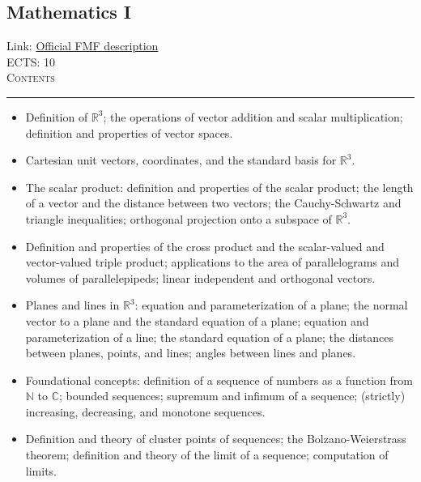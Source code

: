 \documentclass[11pt, a4paper]{article}
\newenvironment{course}[3]{
\subsection{#1}%
Link: \href{#2}{Official FMF description}\\%
ECTS: #3%
\vspace{1ex}
\\
{\large \textsc{Contents}}\\[-0.9ex]%
\rule{\textwidth}{0.5pt}
\vspace{-3ex}
}
{}
\newenvironment{chapter}[1]{
\begin{tcolorbox}[title=#1, breakable]
}
{\end{tcolorbox}}
\begin{document}
\begin{course}{Mathematics I}{https://www.fmf.uni-lj.si/en/study-physics/programmes/1fiz/2020/7000777/courses/520/}{10}
\begin{chapter}{Numbers}
\begin{itemize}
        \end{itemize}
    \end{chapter}

    \begin{chapter}{Geometry of the Euclidean space $ \mathbb{R}^{3} $}
        \begin{itemize}
        
            \item Definition of $ \mathbb{R}^{3} $; the operations of vector addition and scalar multiplication; definition and properties of vector spaces.

            \item Cartesian unit vectors, coordinates, and the standard basis for $ \mathbb{R}^{3} $.

            \item The scalar product: definition and properties of the scalar product; the length of a vector and the distance between two vectors; the Cauchy-Schwartz and triangle inequalities; orthogonal projection onto a subspace of $ \mathbb{R}^{3} $.

            \item Definition and properties of the cross product and the scalar-valued and vector-valued triple product; applications to the area of parallelograms and volumes of parallelepipeds; linear independent and orthogonal vectors.
        
            \item Planes and lines in $ \mathbb{R}^{3} $: equation and parameterization of a plane; the normal vector to a plane and the standard equation of a plane; equation and parameterization of a line; the standard equation of a plane; the distances between planes, points, and lines; angles between lines and planes.

        \end{itemize}
    \end{chapter}

    \begin{chapter}{Sequences of numbers}
        \begin{itemize}
        
            \item Foundational concepts: definition of a sequence of numbers as a function from $ \mathbb{N} $ to $ \mathbb{C} $; bounded sequences; supremum and infimum of a sequence; (strictly) increasing, decreasing, and monotone sequences.

            \item Definition and theory of cluster points of sequences; the Bolzano-Weierstrass theorem;
            definition and theory of the limit of a sequence; computation of limits.


\end{itemize}
\end{chapter}
\end{course}
\end{document}
